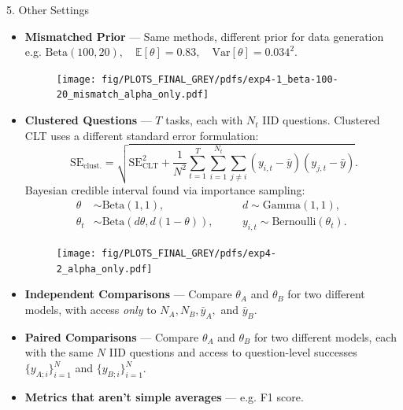 \documentclass[final]{beamer}
\newlength{\colwidth}
\begin{document}
\begin{frame}[fragile]
\begin{columns}[t]
\begin{column}{\colwidth}
\begin{exampleblock}{5. Other Settings}
    \begin{itemize}
      \item \textbf{Mismatched Prior} --- Same methods, different prior for data generation e.g. 
      $\text{Beta}(100,20), \quad \mathbb{E}[\theta] = 0.83, \quad \text{Var}[\theta] = 0.034^2.$ \\
      \vspace{-0.75em}
      \begin{figure}
        \centering
        \texttt{[image: fig/PLOTS\_FINAL\_GREY/pdfs/exp4-1\_beta-100-20\_mismatch\_alpha\_only.pdf]}
      \end{figure}
      \vspace{-0.5em}
      \item \textbf{Clustered Questions} --- $T$ tasks, each with $N_t$ IID questions.
      Clustered CLT uses a different standard error formulation:
      $$
      \text{SE}_\text{clust.} = \sqrt{\text{SE}_\text{CLT}^2 + \frac{1}{N^2}\sum_{t=1}^T \sum_{i=1}^{N_t} \sum_{j \neq i} (y_{i,t} - \bar{y})(y_{j,t} - \bar{y})}.
      $$
      Bayesian credible interval found via importance sampling:
      $$
        \begin{aligned}
        \theta &\sim \text{Beta}(1, 1), \quad 
        &&d \sim \text{Gamma}(1, 1), \quad \\
        \theta_t &\sim \text{Beta}(d \theta, d (1-\theta)), \quad
        &&y_{i,t} \sim \text{Bernoulli}(\theta_t).
        \end{aligned}
      $$
      
      \begin{figure}
        \centering
        \texttt{[image: fig/PLOTS\_FINAL\_GREY/pdfs/exp4-2\_alpha\_only.pdf]}
      \end{figure}
      \item \textbf{Independent Comparisons} --- Compare $\theta_A$ and $\theta_B$ for two different models, with access \textit{only} to $N_A, N_B, \bar{y}_A,$ and $\bar{y}_B$.
      \item \textbf{Paired Comparisons} --- Compare $\theta_A$ and $\theta_B$ for two different models, each with the same $N$ IID questions and access to question-level successes $\{y_{A;i}\}_{i=1}^N$ and $\{y_{B;i}\}_{i=1}^N$.
      \item \textbf{Metrics that aren't simple averages} --- e.g. F1 score.
    \end{itemize}


\end{exampleblock}
\end{column}
\end{columns}
\end{frame}
\end{document}
